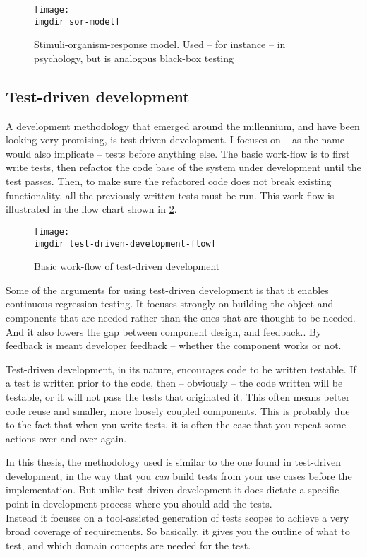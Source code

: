\begin{figure}[!htbp]
  \centering
  \texttt{[image: \\imgdir sor-model]}
  \caption{Stimuli-organism-response model. Used -- for instance -- in psychology, but is analogous black-box testing}
  \label{fig:sor-model}
\end{figure}
\subsection{Test-driven development}
\label{ssec:test-driven-development}
A development methodology that emerged around the millennium, and have been looking very promising, is test-driven development. I focuses on -- as the name would also implicate -- tests before anything else. The basic work-flow is to first write tests, then refactor the code base of the system under development until the test passes. Then, to make sure the refactored code does not break existing functionality, all the previously written tests must be run. This work-flow is illustrated in the flow chart shown in \ref{fig:test-driven-development-flow}.\medskip
\begin{figure}[!htbp]
\centering
\texttt{[image: \\imgdir test-driven-development-flow]}
\caption{Basic work-flow of test-driven development}
\label{fig:test-driven-development-flow}
\end{figure}
\noindent Some of the arguments for using test-driven development is that it enables continuous regression testing. It focuses strongly on building the object and components that are needed rather than the ones that are thought to be needed. And it also lowers the gap between component design, and feedback.\cite{george2003}. By feedback is meant developer feedback -- whether the component works or not.\smallskip

\noindent Test-driven development, in its nature, encourages code to be written testable. If a test is written prior to the code, then -- obviously -- the code written will be testable, or it will not pass the tests that originated it. This often means better code reuse and smaller, more loosely coupled components. This is probably due to the fact that when you write tests, it is often the case that you repeat some actions over and over again.\medskip

\noindent In this thesis, the methodology used is similar to the one found in test-driven development, in the way that you \emph{can} build tests from your use cases before the implementation. But unlike test-driven development it does dictate a specific point in development process where you should add the tests.\\
Instead it focuses on a tool-assisted generation of tests scopes to achieve a very broad coverage of requirements. So basically, it gives you the outline of what to test, and which domain concepts are needed for the test.

